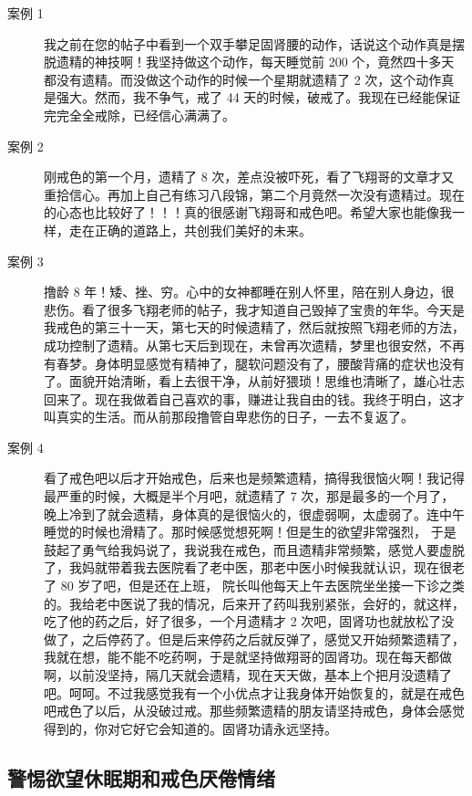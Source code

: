 \documentclass{ctexart}
\begin{document}
\begin{description}
    \item[案例 1] 我之前在您的帖子中看到一个双手攀足固肾腰的动作，话说这个动作真是摆脱遗精的神技啊！我坚持做这个动作，每天睡觉前 200 个，竟然四十多天都没有遗精。而没做这个动作的时候一个星期就遗精了 2 次，这个动作真是强大。然而，我不争气，戒了 44 天的时候，破戒了。我现在已经能保证完完全全戒除，已经信心满满了。
    \item[案例 2] 刚戒色的第一个月，遗精了 8 次，差点没被吓死，看了飞翔哥的文章才又重拾信心。再加上自己有练习八段锦，第二个月竟然一次没有遗精过。现在的心态也比较好了！！！真的很感谢飞翔哥和戒色吧。希望大家也能像我一样，走在正确的道路上，共创我们美好的未来。
    \item[案例 3] 撸龄 8 年！矮、挫、穷。心中的女神都睡在别人怀里，陪在别人身边，很悲伤。看了很多飞翔老师的帖子，我才知道自己毁掉了宝贵的年华。今天是我戒色的第三十一天，第七天的时候遗精了，然后就按照飞翔老师的方法，成功控制了遗精。从第七天后到现在，未曾再次遗精，梦里也很安然，不再有春梦。身体明显感觉有精神了，腿软问题没有了，腰酸背痛的症状也没有了。面貌开始清晰，看上去很干净，从前好猥琐！思维也清晰了，雄心壮志回来了。现在我做着自己喜欢的事，赚进让我自由的钱。我终于明白，这才叫真实的生活。而从前那段撸管自卑悲伤的日子，一去不复返了。
    \item[案例 4] 看了戒色吧以后才开始戒色，后来也是频繁遗精，搞得我很恼火啊！我记得最严重的时候，大概是半个月吧，就遗精了 7 次，那是最多的一个月了，晚上冷到了就会遗精，身体真的是很恼火的，很虚弱啊，太虚弱了。连中午睡觉的时候也滑精了。那时候感觉想死啊！但是生的欲望非常强烈， 于是鼓起了勇气给我妈说了，我说我在戒色，而且遗精非常频繁，感觉人要虚脱了，我妈就带着我去医院看了老中医，那老中医小时候我就认识，现在很老了 80 岁了吧，但是还在上班， 院长叫他每天上午去医院坐坐接一下诊之类的。我给老中医说了我的情况，后来开了药叫我别紧张，会好的，就这样，吃了他的药之后，好了很多，一个月遗精才 2 次吧，固肾功也就放松了没做了，之后停药了。但是后来停药之后就反弹了，感觉又开始频繁遗精了，我就在想，能不能不吃药啊，于是就坚持做翔哥的固肾功。现在每天都做啊，以前没坚持，隔几天就会遗精，现在天天做，基本上个把月没遗精了吧。呵呵。不过我感觉我有一个小优点才让我身体开始恢复的，就是在戒色吧戒色了以后，从没破过戒。那些频繁遗精的朋友请坚持戒色，身体会感觉得到的，你对它好它会知道的。固肾功请永远坚持。
\end{description}

\subsection{警惕欲望休眠期和戒色厌倦情绪}
\end{document}
